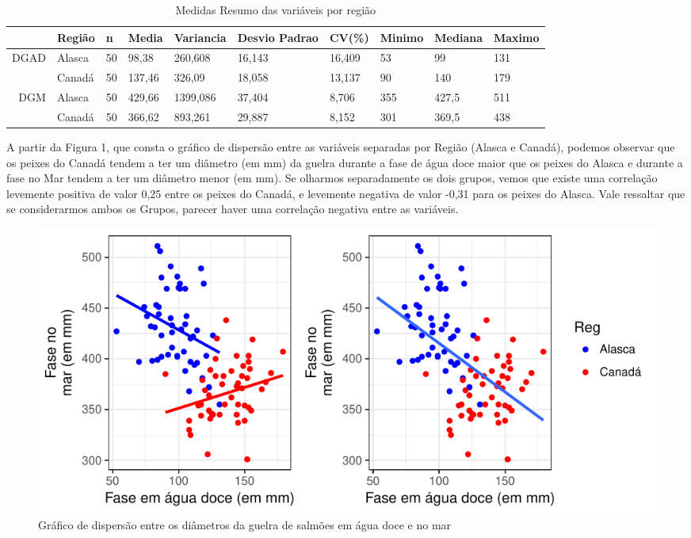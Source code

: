 \documentclass[10pt,portuguese,]{article}
\begin{document}
\begin{table}[ht]
\centering
\caption{Medidas Resumo das variáveis por região}
\bgroup
\def\arraystretch{1.0}
\begin{tabular}{rlllllllll}
  \toprule
 & Região & n & Media & Variancia & Desvio Padrao & CV(\%) & Minimo & Mediana & Maximo \\ \midrule
  \hline
\multirow{2}{*}{DGAD} & Alasca & 50 & 98,38 & 260,608 & 16,143 & 16,409 & 53 & 99 & 131 \\ 
   & Canadá & 50 & 137,46 & 326,09 & 18,058 & 13,137 & 90 & 140 & 179 \\ \midrule
\multirow{2}{*}{DGM} & Alasca & 50 & 429,66 & 1399,086 & 37,404 & 8,706 & 355 & 427,5 & 511 \\ 
   & Canadá & 50 & 366,62 & 893,261 & 29,887 & 8,152 & 301 & 369,5 & 438 \\ \bottomrule
   \hline
\end{tabular}
\egroup
\end{table}

A partir da Figura 1, que consta o gráfico de dispersão entre as
variáveis separadas por Região (Alasca e Canadá), podemos observar que
os peixes do Canadá tendem a ter um diâmetro (em mm) da guelra durante a
fase de água doce maior que os peixes do Alasca e durante a fase no Mar
tendem a ter um diâmetro menor (em mm). Se olharmos separadamente os
dois grupos, vemos que existe uma correlação levemente positiva de valor
0,25 entre os peixes do Canadá, e levemente negativa de valor -0,31 para
os peixes do Alasca. Vale ressaltar que se considerarmos ambos os
Grupos, parecer haver uma correlação negativa entre as variáveis.

\vspace{0.5cm}

\begin{figure}[!h]

{\centering \includegraphics{RELATORIO_FINAL_FORMATADO_files/figure-latex/unnamed-chunk-10-1} 

}

\caption{Gráfico de dispersão entre os diâmetros da guelra de salmões em água doce e no mar}\label{fig:unnamed-chunk-10}
\end{figure}
\end{document}
